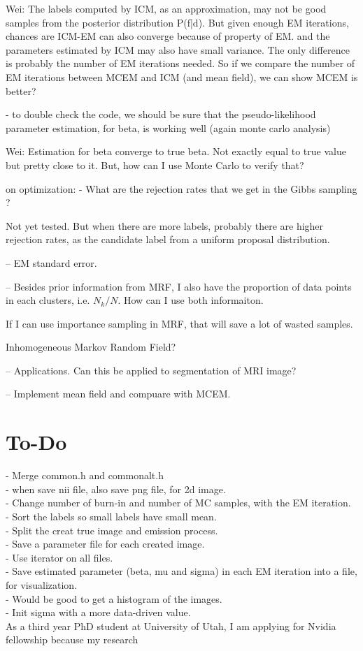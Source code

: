\documentclass[12pt]{article}
\begin{document}
Wei: The labels computed by ICM, as an approximation, may not be good samples from the posterior distribution P(f|d). But given enough EM iterations, chances are ICM-EM can also converge because of property of EM. and the parameters estimated by ICM may also have small variance. The only difference is probably the number of EM iterations needed. So if we compare the number of EM iterations between MCEM and ICM (and mean field), we can show MCEM is better?

- to double check the code, we should be sure that the pseudo-likelihood parameter estimation, for beta, is working well (again monte carlo analysis)

Wei: Estimation for beta converge to true beta. Not exactly equal to true value but pretty close to it. But, how can I use Monte Carlo to verify that?

on optimization:
- What are the rejection rates that we get in the Gibbs sampling ?

Not yet tested. But when there are more labels, probably there are higher rejection rates, as the candidate label from a uniform proposal distribution.

-- EM standard error.

-- Besides prior information from MRF, I also have the proportion of data points in each clusters, i.e. $N_k/ N$. How can I use both informaiton.

If I can use importance sampling in MRF, that will save a lot of wasted samples.

Inhomogeneous Markov Random Field?

-- Applications. Can this be applied to segmentation of MRI image?

-- Implement mean field and compuare with MCEM.

\section{To-Do}
- Merge common.h and commonalt.h\\
- when save nii file, also save png file, for 2d image.\\
- Change number of burn-in and number of MC samples, with the EM iteration.\\
- Sort the labels so small labels have small mean.\\
- Split the creat true image and emission process.\\
- Save a parameter file for each created image.\\
- Use iterator on all files.\\
- Save estimated parameter (beta, mu and sigma) in each EM iteration into a file, for visualization.\\
- Would be good to get a histogram of the images.\\
- Init sigma with a more data-driven value.\\


As a third year PhD student at University of Utah, I am applying for Nvidia fellowship because my research



\end{document}
